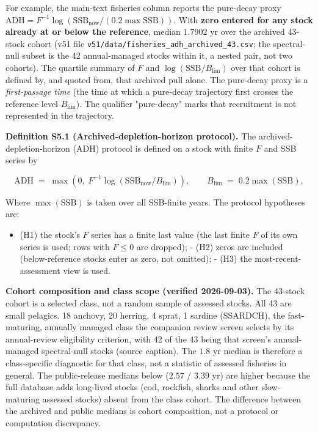 \documentclass[11pt]{article}
\begin{document}
For example, the main-text fisheries column reports the pure-decay proxy \(\mathrm{ADH} = F^{-1}\log(\mathrm{SSB}_{\mathrm{now}}/(0.2\max\mathrm{SSB}))\). With \textbf{zero entered for any stock already at or below the reference}, median \(1.7902\) yr over the archived 43-stock cohort (v51 file \texttt{v51/data/fisheries\_adh\_archived\_43.csv}; the spectral-null subset is the 42 annual-managed stocks within it, a nested pair, not two cohorts). The quartile summary of \(F\) and \(\log(\mathrm{SSB}/B_{\lim})\) over that cohort is defined by, and quoted from, that archived pull alone. The pure-decay proxy is a \emph{first-passage time} (the time at which a pure-decay trajectory first crosses the reference level \(B_{\lim}\)). The qualifier "pure-decay" marks that recruitment is not represented in the trajectory.

\textbf{Definition S5.1 (Archived-depletion-horizon protocol).} The archived-depletion-horizon (ADH) protocol is defined on a stock with finite \(F\) and SSB series by

\[ \mathrm{ADH} \;=\; \max\!\left(0,\; F^{-1}\log\!\left(\mathrm{SSB}_{\mathrm{now}}/B_{\lim}\right)\right), \qquad B_{\lim} \;=\; 0.2\max(\mathrm{SSB}), \]

Where \(\max(\mathrm{SSB})\) is taken over all SSB-finite years. The protocol hypotheses are:

\begin{itemize}\setlength{\itemsep}{2pt}
\item (H1) the stock's \(F\) series has a finite last value (the last finite \(F\) of its own series is used; rows with \(F \le 0\) are dropped); - (H2) zeros are included (below-reference stocks enter as zero, not omitted); - (H3) the most-recent-assessment view is used.
\end{itemize}

\textbf{Cohort composition and class scope (verified 2026-09-03).} The 43-stock cohort is a selected class, not a random sample of assessed stocks. All 43 are small pelagics. 18 anchovy, 20 herring, 4 sprat, 1 sardine (SSARDCH), the fast-maturing, annually managed class the companion review screen selects by its annual-review eligibility criterion, with 42 of the 43 being that screen's annual-managed spectral-null stocks (source caption). The \(1.8\) yr median is therefore a class-specific diagnostic for that class, not a statistic of assessed fisheries in general. The public-release medians below (\(2.57\) / \(3.39\) yr) are higher because the full database adds long-lived stocks (cod, rockfish, sharks and other slow-maturing assessed stocks) absent from the class cohort. The difference between the archived and public medians is cohort composition, not a protocol or computation discrepancy.
\end{document}
